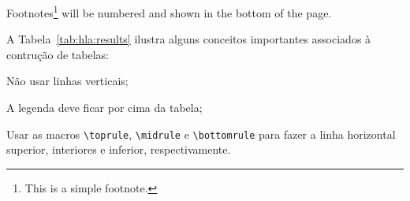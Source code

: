 Footnotes\footnote{This is a simple footnote.} will be numbered and shown in the bottom of the page.


A Tabela~\ref{tab:hla:results} ilustra alguns conceitos importantes associados à contrução de tabelas:
\begin{asparaenum}[i)]
	\item Não usar linhas verticais;
	\item A legenda deve ficar por cima da tabela;
	\item Usar as macros \verb!\toprule!, \verb!\midrule! e \verb!\bottomrule! para fazer a linha horizontal superior, interiores e inferior, respectivamente.
\end{asparaenum}

\bgroup
{}
